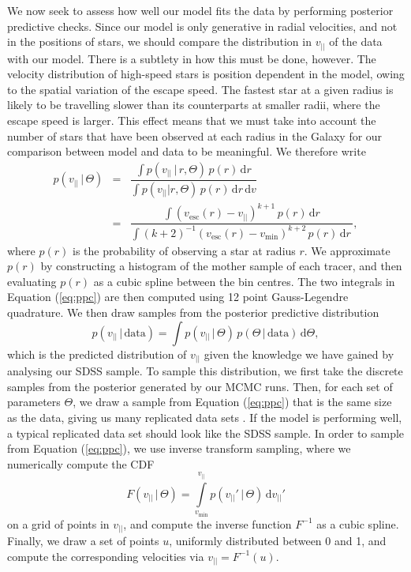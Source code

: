 \documentclass[useAMS,twocolumn,usenatbib]{mn2e}
\def\vlos{{v_{||}}}
\def\vesc{{v_\mathrm{esc}}}
\def\vmin{{v_\mathrm{min}}}
\def\intd{{\mathrm{d}}}
\begin{document}
We now seek to assess how well our model fits the data by 
performing posterior predictive checks. Since our model is only generative in radial velocities, 
and not in the positions of stars, we should compare the distribution in $\vlos$ of the data 
with our model. There is a subtlety in how this must be done, however. The velocity 
distribution  of high-speed stars is position dependent in the model, 
owing to the spatial variation of the escape speed. The fastest star at a given radius is likely to be 
travelling slower than its counterparts at smaller radii, where the escape speed is larger. This effect 
means that we must take into account the number of stars that have been observed at each radius in the 
Galaxy for our comparison between model and data to be meaningful. We therefore write  
%
\begin{eqnarray}
p(\vlos \,|\, \Theta) &=& \dfrac{\int p(\vlos \,|\, r, \Theta)\,p(r)\,\intd r}{\int p(\vlos | r, \Theta)\,p(r)\,\intd r\,\intd v} \nonumber \\
                  &=& \dfrac{\int (\vesc(r) - \vlos)^{k+1}\,p(r)\,\intd r}{\int (k+2)^{-1}(\vesc(r) - \vmin)^{k+2}\,p(r)\,\intd r\,},
\label{eq:ppc}
\end{eqnarray}
%
where $p(r)$ is the probability of observing a star at radius $r$. We approximate 
$p(r)$ by constructing a histogram of the mother sample of each tracer, and then 
evaluating $p(r)$ as a cubic spline between the bin centres. The two integrals in 
Equation (\ref{eq:ppc}) are then computed using 12 point Gauss-Legendre quadrature. 
We then draw samples from the posterior predictive distribution
%
\begin{equation}
p(\vlos\,|\,\mathrm{data}) = \int p(\vlos\,|\,\Theta)\,p(\Theta\,|\,\mathrm{data})\,\intd \Theta,
\end{equation}
%
which is the predicted distribution of $\vlos$ given the knowledge we have gained by analysing our SDSS sample. 
To sample this distribution, we first take the discrete samples from the posterior generated by our MCMC 
runs. Then, for each set of parameters $\Theta$, we draw a sample from Equation (\ref{eq:ppc}) that is the 
same size as the data, giving us many replicated data sets \citep{Ge13}. If the model is performing well, a typical 
replicated data set should look like the SDSS sample. In order to sample from Equation (\ref{eq:ppc}), we 
use inverse transform sampling, where we numerically compute the CDF
%
\begin{equation}
F(\vlos \,|\, \Theta) = \int\limits_{v_\mathrm{min}}^{\vlos} p(\vlos'\,|\,\Theta)\,\intd \vlos'
\end{equation}
%
on a grid of points in $\vlos$, and compute the inverse function $F^{-1}$ as a cubic spline. Finally, we 
draw a set of points $u$, uniformly distributed between 0 and 1, and compute the corresponding velocities 
via $\vlos = F^{-1}(u)$.
\end{document}

